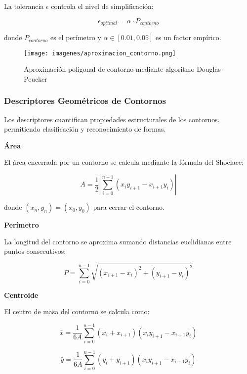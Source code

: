 La tolerancia $\epsilon$ controla el nivel de simplificación:

\begin{equation}
\epsilon_{optimal} = \alpha \cdot P_{contorno}
\end{equation}

donde $P_{contorno}$ es el perímetro y $\alpha \in [0.01, 0.05]$ es un factor empírico.

\begin{figure}[h]
\centering
\texttt{[image: imagenes/aproximacion\_contorno.png]}
\caption{Aproximación poligonal de contorno mediante algoritmo Douglas-Peucker}
\label{fig:aproximacion_contorno}
\end{figure}

\subsubsection{Descriptores Geométricos de Contornos}

Los descriptores cuantifican propiedades estructurales de los contornos, permitiendo clasificación y reconocimiento de formas.

\textbf{Área}

El área encerrada por un contorno se calcula mediante la fórmula del Shoelace:

\begin{equation}
A = \frac{1}{2}\left|\sum_{i=0}^{n-1}(x_i y_{i+1} - x_{i+1}y_i)\right|
\end{equation}

donde $(x_n, y_n) = (x_0, y_0)$ para cerrar el contorno.

\textbf{Perímetro}

La longitud del contorno se aproxima sumando distancias euclidianas entre puntos consecutivos:

\begin{equation}
P = \sum_{i=0}^{n-1}\sqrt{(x_{i+1}-x_i)^2 + (y_{i+1}-y_i)^2}
\end{equation}

\textbf{Centroide}

El centro de masa del contorno se calcula como:

\begin{equation}
\bar{x} = \frac{1}{6A}\sum_{i=0}^{n-1}(x_i + x_{i+1})(x_i y_{i+1} - x_{i+1}y_i)
\end{equation}

\begin{equation}
\bar{y} = \frac{1}{6A}\sum_{i=0}^{n-1}(y_i + y_{i+1})(x_i y_{i+1} - x_{i+1}y_i)
\end{equation}

